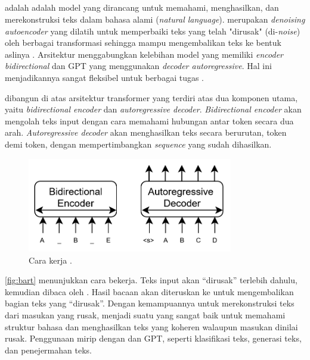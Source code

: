 \subsection{\bartfull}
\label{subsec:bart}

\bartfull adalah adalah model \ml{} yang dirancang untuk memahami, menghasilkan, dan merekonstruksi teks dalam bahasa alami (\emph{natural language}). \bart{} merupakan \emph{denoising autoencoder} yang dilatih untuk memperbaiki teks yang telah "dirusak" (di-\emph{noise}) oleh berbagai transformasi sehingga mampu mengembalikan teks ke bentuk aslinya \parencite{lewis2019bart}. Arsitektur \bart{} menggabungkan kelebihan model \bert{} yang memiliki \emph{encoder bidirectional} dan GPT yang menggunakan \emph{decoder autoregressive}. Hal ini menjadikannya sangat fleksibel untuk berbagai tugas \nlpfull.

\bart{} dibangun di atas arsitektur transformer yang terdiri atas dua 
komponen utama, yaitu \emph{bidirectional encoder} dan \textit{autoregressive decoder}. 
\emph{Bidirectional encoder} akan mengolah teks input dengan cara memahami hubungan antar token secara dua arah. \emph{Autoregressive decoder} akan menghasilkan teks secara berurutan, token demi token, dengan mempertimbangkan \emph{sequence} yang sudah dihasilkan.

\begin{figure}
\centering
\includegraphics[width=0.8\textwidth]{images/bart.png}
\caption{Cara kerja \bart{} \parencite{lewis2019bart}.}
\label{fig:bart}
\end{figure}

\autoref{fig:bart} menunjukkan cara \bart{} bekerja. Teks input akan “dirusak” terlebih dahulu, kemudian dibaca oleh \encoder. Hasil bacaan \encoder{} akan diteruskan ke \decoder{} untuk mengembalikan bagian teks yang “dirusak”. Dengan kemampuannya untuk merekonstruksi teks dari masukan yang rusak, \bart{} menjadi suatu \transformer{} yang sangat baik untuk memahami struktur bahasa dan menghasilkan teks yang koheren walaupun masukan dinilai 
rusak. Penggunaan \bart{} mirip dengan \bert{} dan GPT, seperti klasifikasi teks, generasi teks, dan penejermahan teks. 


